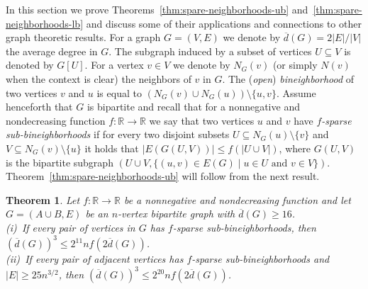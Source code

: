 \documentclass[11pt]{article}
\newtheorem{theorem}{Theorem}
\theoremstyle{definition}
\newtheorem{definition}{Definition}
\begin{document}
In this section we prove Theorems~\ref{thm:spare-neighborhoods-ub} and~\ref{thm:spare-neighborhoods-lb} and discuss some of their applications and connections to other graph theoretic results.
For a graph $G=(V,E)$ we denote by $\overline{d}(G)=2|E|/|V|$ the average degree in $G$. 
The subgraph induced by a subset of vertices $U \subseteq V$ is denoted by $G[U]$.
For a vertex $v \in V$ we denote by $N_G(v)$ (or simply $N(v)$ when the context is clear) the neighbors of $v$ in $G$.
The (\emph{open}) \emph{bineighborhood} of two vertices $v$ and $u$ is equal to $(N_G(v) \cup N_G(u)) \setminus \{u,v\}$.
Assume henceforth that $G$ is bipartite and 
recall that for a nonnegative and nondecreasing function $f:\mathbb{R} \rightarrow \mathbb{R}$ we say that two vertices $u$ and $v$ have \emph{$f$-sparse sub-bineighborhoods}
if for every two disjoint subsets $U \subseteq N_G(u) \setminus \{v\}$ and $V \subseteq N_G(v) \setminus \{u\}$ it holds that $|E(G(U,V))| \le f(|U \cup V|)$, where $G(U,V)$ is the bipartite subgraph $(U \cup V, \{(u,v) \in E(G) \mid u\in U \textrm{ and } v\in V\})$.
Theorem~\ref{thm:spare-neighborhoods-ub} will follow from the next result.

\begin{theorem}
	\label{thm:f-sparse-neighborhoods}
	Let $f:\mathbb{R} \rightarrow \mathbb{R}$ be a nonnegative and nondecreasing function and let $G=(A \cup B,E)$ be an $n$-vertex bipartite graph with $\overline{d}(G) \ge 16$. \\
	(i)~If every pair of vertices in $G$ has $f$-sparse sub-bineighborhoods, then $(\overline{d}(G))^3 \le 2^{11}nf(2\overline{d}(G))$.\\
	(ii)~If every pair of adjacent vertices has $f$-sparse sub-bineighborhoods and $|E| \ge 25n^{3/2}$, then $(\overline{d}(G))^3 \le 2^{20}nf(2\overline{d}(G))$.
\end{theorem}
\end{document}

